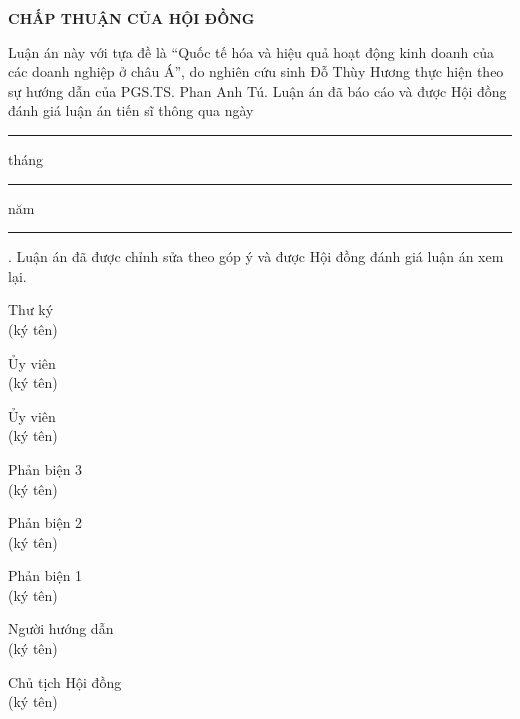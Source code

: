 \documentclass[
  a4paper,
  13pt]{extreport}
\begin{document}
\thispagestyle{empty}
\begin{center}
{\fontsize{14}{18}\selectfont\bfseries CHẤP THUẬN CỦA HỘI ĐỒNG}
\end{center}

\vspace{0.5cm}
\hspace*{1cm}Luận án này với tựa đề là ``Quốc tế hóa và hiệu quả hoạt động kinh doanh của các doanh nghiệp ở châu Á'', do nghiên cứu sinh Đỗ Thùy Hương thực hiện theo sự hướng dẫn của PGS.TS. Phan Anh Tú. Luận án đã báo cáo và được Hội đồng đánh giá luận án tiến sĩ thông qua ngày \rule{1.2cm}{0.4pt} tháng \rule{1.2cm}{0.4pt} năm \rule{1.6cm}{0.4pt}. Luận án đã được chỉnh sửa theo góp ý và được Hội đồng đánh giá luận án xem lại.

\vspace{1.0cm}
\vspace{0.8cm}
\noindent\begin{minipage}[t]{0.48\textwidth}\centering Thư ký\\[2cm](ký tên)\end{minipage}\hfill\begin{minipage}[t]{0.48\textwidth}\centering Ủy viên\\[2cm](ký tên)\end{minipage}

\vspace{1.2cm}
\noindent\begin{minipage}[t]{0.48\textwidth}\centering Ủy viên\\[2cm](ký tên)\end{minipage}\hfill\begin{minipage}[t]{0.48\textwidth}\centering Phản biện 3\\[2cm](ký tên)\end{minipage}

\vspace{1.2cm}
\noindent\begin{minipage}[t]{0.48\textwidth}\centering Phản biện 2\\[2cm](ký tên)\end{minipage}\hfill\begin{minipage}[t]{0.48\textwidth}\centering Phản biện 1\\[2cm](ký tên)\end{minipage}

\vspace{1.2cm}
\noindent\begin{minipage}[t]{0.48\textwidth}\centering Người hướng dẫn\\[2cm](ký tên)\end{minipage}\hfill\begin{minipage}[t]{0.48\textwidth}\centering Chủ tịch Hội đồng\\[2cm](ký tên)\end{minipage}
\end{document}
